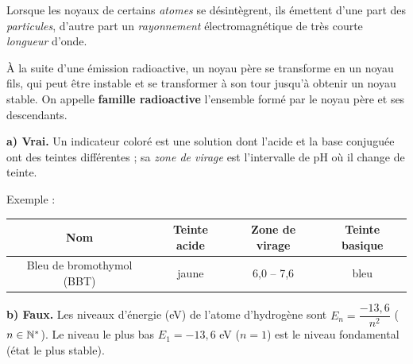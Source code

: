 \documentclass[11pt]{article}
\begin{document}


Lorsque les noyaux de certains \emph{atomes} se désintègrent, ils émettent d'une part des \emph{particules}, d'autre part un \emph{rayonnement} électromagnétique de très courte \emph{longueur} d'onde.

À la suite d'une émission radioactive, un noyau père se transforme en un noyau fils, qui peut être instable et se transformer à son tour jusqu'à obtenir un noyau stable. On appelle \textbf{famille radioactive} l'ensemble formé par le noyau père et ses descendants.

\textbf{a) Vrai.} Un indicateur coloré est une solution dont l'acide et la base conjuguée ont des teintes différentes ; sa \emph{zone de virage} est l'intervalle de pH où il change de teinte.
\begin{center}
\end{center}
Exemple :
\begin{center}\renewcommand{\arraystretch}{1.3}
\begin{tabular}{|c|c|c|c|}
\hline Nom & Teinte acide & Zone de virage & Teinte basique \\
\hline Bleu de bromothymol (BBT) & jaune & 6,0 -- 7,6 & bleu \\
\hline
\end{tabular}
\end{center}

\textbf{b) Faux.} Les niveaux d'énergie (eV) de l'atome d'hydrogène sont $E_n = \dfrac{-13{,}6}{n^2}$ ($n \in \mathbb{N}^*$). Le niveau le plus bas $E_1 = -13{,}6$ eV ($n=1$) est le niveau fondamental (état le plus stable).
\end{document}
